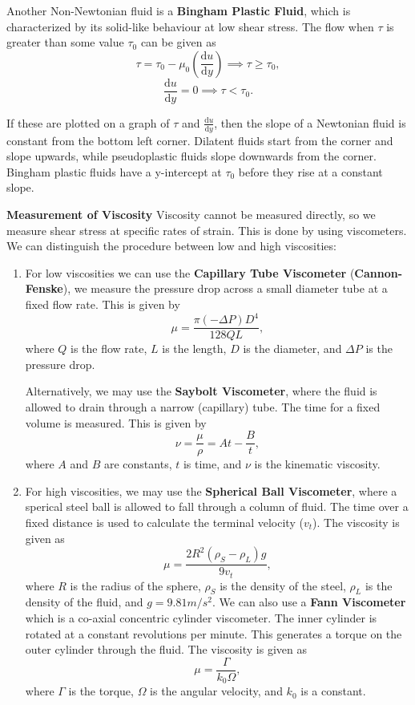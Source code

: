 \documentclass[11pt]{article}
\theoremstyle{plain} %
\theoremstyle{definition}
\theoremstyle{example}
\theoremstyle{remark}
\begin{document}
Another Non-Newtonian fluid is a \textbf{Bingham Plastic Fluid}, which is characterized by its solid-like behaviour at low shear stress. The flow when  $\tau$ is greater than some value $\tau_0$ can be given as 
$$\tau = \tau_0-\mu_0\left(\frac{\mathrm d u}{\mathrm d y}\right) \implies \tau \geq \tau_0,$$
$$\frac{\mathrm d u}{\mathrm d y} = 0 \implies \tau < \tau_0.$$
	
If these are plotted on a graph of $\tau$ and $\frac{\mathrm d u}{\mathrm d y}$, then the slope of a Newtonian fluid is constant from the bottom left corner. Dilatent fluids start from the corner and slope upwards, while pseudoplastic fluids slope downwards from the corner. Bingham plastic fluids have a y-intercept at $\tau_0$ before they rise at a constant slope. 
	
\textbf{Measurement of Viscosity}
Viscosity cannot be measured directly, so we measure shear stress at specific rates of strain. This is done by using viscometers. We can distinguish the procedure between low and high viscosities:
\begin{enumerate}
	\item For low viscosities we can use the \textbf{Capillary Tube Viscometer} (\textbf{Cannon-Fenske}), we measure the pressure drop across a small diameter tube at a fixed flow rate. This is given by 
	$$\mu = \frac{\pi(-\Delta P)D^4}{128QL},$$
	where $Q$ is the flow rate, $L$ is the length, $D$ is the diameter, and $\Delta P$ is the pressure drop. 
	
	Alternatively, we may use the \textbf{Saybolt Viscometer}, where the fluid is allowed to drain through a narrow (capillary) tube. The time for a fixed volume is measured. This is given by 
	$$\nu = \frac{\mu}{\rho} = At-\frac{B}{t},$$
	where $A$ and $B$ are constants, $t$ is time, and $\nu$ is the kinematic viscosity. 
	\item For high viscosities, we may use the \textbf{Spherical Ball Viscometer}, where a sperical steel ball is allowed to fall through a column of fluid. The time over a fixed distance is used to calculate the terminal velocity ($v_t$). The viscosity is given as 
	$$\mu = \frac{2R^2(\rho_S-\rho_L)g}{9v_t},$$
	where $R$ is the radius of the sphere, $\rho_S$ is the density of the steel, $\rho_L$ is the density of the fluid, and $g = 9.81m/s^2$. We can also use a \textbf{Fann Viscometer} which is a co-axial concentric cylinder viscometer. The inner cylinder is rotated at a constant revolutions per minute. This generates a torque on the outer cylinder through the fluid. The viscosity is given as 
	$$\mu = \frac{\Gamma}{k_0\Omega},$$
	where $\Gamma$ is the torque, $\Omega$ is the angular velocity, and $k_0$ is a constant. 
\end{enumerate}
	
\end{document}
